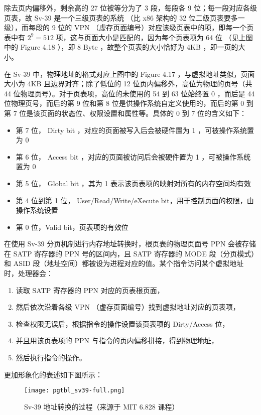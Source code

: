 除去页内偏移外，剩余高的 27 位被等分为了 3 段，每段各 9 位；每一段对应各级页表，故 Sv-39 是一个三级页表的系统 （比 x86 架构的 32 位二级页表要多一级），而每段的 9 位的 VPN （虚存页面编号）对应该级页表中的项，即每一个页表中有 $2^9 = 512$ 项，这与页面大小是匹配的，因为每个页表项为 64 位 （见上图中的 Figure 4.18 ），即 8 Byte ，故整个页表的大小恰好为 4KB ，即一页的大小。

在 Sv-39 中，物理地址的格式对应上图中的 Figure 4.17 ，与虚拟地址类似，页面大小为 4KB 且边界对齐；除了低位的 12 位页内偏移外，高位为物理的页号（共 44 位物理页号）。对于页表项，高位的未使用的 54 到 63 位始终置 0 ，而后是 44 位物理页号，而后的第 9 位和第 8 位是供操作系统自定义使用的，而后的第 0 到第 7 位是该页面的状态位、权限设置和属性等。具体的 0 到 7 位的含义如下：
\begin{itemize}
    \item 第 7 位， Dirty bit ，对应的页面被写入后会被硬件置为 1 ，可被操作系统置为 0
    \item 第 6 位， Access bit ，对应的页面被访问后会被硬件置为 1 ，可被操作系统置为 0
    \item 第 5 位， Global bit ，其为 1 表示该页表项的映射对所有的内存空间均有效
    \item 第 4 位到第 1 位， User/Read/Write/eXecute bit，用于控制页面的权限，由操作系统设置
    \item 第 0 位，Valid bit，页表项的有效位
\end{itemize}

在使用 Sv-39 分页机制进行内存地址转换时，根页表的物理页面号 PPN 会被存储在 SATP 寄存器的 PPN 号的区间内，且 SATP 寄存器的 MODE 段（分页模式）和 ASID 段（地址空间）都被设为进程对应的值。某个指令访问某个虚拟地址时，处理器会：
\begin{enumerate}
    \item 读取 SATP 寄存器的 PPN 对应的页表根页面，
    \item 然后依次沿着各级 VPN （虚存页面编号）找到虚拟地址对应的页表项，
    \item 检查权限无误后，根据指令的操作设置该页表项的 Dirty/Access 位，
    \item 并且用该页表项的 PPN 与指令的页内偏移拼接，得到物理地址，
    \item 然后执行指令的操作。
\end{enumerate}

更加形象化的表述如下图所示：
\begin{figure}[H]
  \centering
  \texttt{[image: pgtbl\_sv39-full.png]}
  \caption{ Sv-39 地址转换的过程（来源于 MIT 6.828 课程） }
\end{figure}

